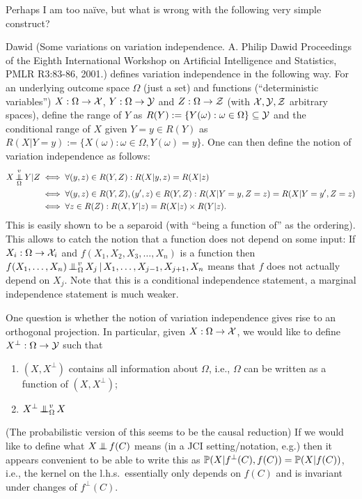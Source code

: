 Perhaps I am too na\"ive, but what is wrong with the following very simple construct?

Dawid (Some variations on variation independence.
A. Philip Dawid Proceedings of the Eighth International Workshop on Artificial Intelligence and Statistics, PMLR R3:83-86, 2001.)
defines variation independence in the following way.
For an underlying outcome space $\Omega$ (just a set) and functions (``deterministic variables'') 
$X : \Omega \to \mathcal{X}$, $Y : \Omega \to \mathcal{Y}$ and $Z : \Omega \to \mathcal{Z}$ (with $\mathcal{X},\mathcal{Y},\mathcal{Z}$ arbitrary spaces), define
the range of $Y$ as $R(Y) := \{Y(\omega) : \omega \in \Omega\} \subseteq \mathcal{Y}$ and the conditional range of $X$ given $Y=y \in R(Y)$ as
$R(X|Y=y) := \{X(\omega) : \omega \in \Omega, Y(\omega) = y\}$. One can then define the notion of variation independence as follows:
\begin{align*}
  X \operatorname*{\perp\mkern-11mu\perp}^v_\Omega Y | Z 
  &\iff \forall (y,z) \in R(Y,Z): R(X | y,z) = R(X|z) \\
  &\iff \forall (y,z) \in R(Y,Z), (y',z) \in R(Y,Z): R(X|Y=y,Z=z) = R(X|Y=y',Z=z) \\
  &\iff \forall z\in R(Z) : R(X,Y|z) = R(X|z) \times R(Y|z).
\end{align*}
This is easily shown to be a separoid (with ``being a function of'' as the ordering).
This allows to catch the notion that a function does not depend on some input:
If $X_i : \Omega \to \mathcal{X}_i$ and $f(X_1,X_2,X_3,\dots,X_n)$ is a function then
$f(X_1,\dots,X_n) \operatorname*{\perp\mkern-11mu\perp}^v_\Omega X_j \operatorname*{|} X_1,\dots,X_{j-1},X_{j+1},X_n$ means
that $f$ does not actually depend on $X_j$. Note that this is a conditional independence
statement, a marginal independence statement is much weaker. 

One question is whether the notion of variation independence gives rise to an orthogonal projection.
In particular, given $X : \Omega \to \mathcal{X}$, we would like to define $X^\perp : \Omega \to \mathcal{Y}$ such 
that 
\begin{enumerate}
  \item $(X,X^\perp)$ contains all information about $\Omega$, i.e., $\Omega$ can be written as a function of $(X,X^\perp)$;
  \item $X^\perp \operatorname*{\perp\mkern-11mu\perp}^v_\Omega X$
\end{enumerate}
(The probabilistic version of this seems to be the causal reduction)
If we would like to define what $X \operatorname*{\perp\mkern-11mu\perp} f(C)$ means (in a JCI setting/notation, e.g.) then it appears convenient to be able to write this as $\mathbb{P}(X | f^\perp(C), f(C)) = \mathbb{P}(X | f(C))$, i.e., the kernel on the l.h.s.\ essentially only depends on $f(C)$ and is invariant under changes of $f^\perp(C)$.

